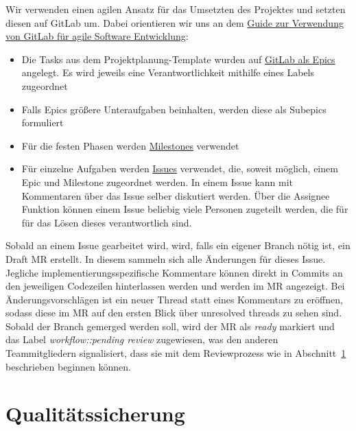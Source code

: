Wir verwenden einen agilen Ansatz für das Umsetzten des Projektes und setzten diesen auf GitLab um.
Dabei orientieren wir uns an dem
\href{https://about.gitlab.com/blog/2018/03/05/gitlab-for-agile-software-development/}{Guide
zur Verwendung von GitLab für agile Software Entwicklung}:
\begin{itemize}
    \item Die Tasks aus dem Projektplanung-Template wurden auf
    \href{https://git.haw-hamburg.de/groups/ss21-esep-gruppe-2.3/-/epics}{GitLab als Epics} angelegt.
    Es wird jeweils eine Verantwortlichkeit mithilfe eines Labels zugeordnet
    \item Falls Epics größere Unteraufgaben beinhalten, werden diese als Subepics formuliert
    \item Für die festen Phasen werden
    \href{https://git.haw-hamburg.de/groups/ss21-esep-gruppe-2.3/-/milestones}{Milestones} verwendet
    \item Für einzelne Aufgaben werden
    \href{https://git.haw-hamburg.de/groups/ss21-esep-gruppe-2.3/-/issues}{Issues}
    verwendet, die, soweit möglich, einem Epic und Milestone zugeordnet werden.
    In einem Issue kann mit Kommentaren über das Issue selber diskutiert werden.
    Über die Assignee Funktion können einem Issue beliebig viele Personen zugeteilt werden, die für
    für das Lösen dieses verantwortlich sind.
\end{itemize}
Sobald an einem Issue gearbeitet wird, wird, falls ein eigener Branch nötig ist, ein Draft MR
erstellt.
In diesem sammeln sich alle Änderungen für dieses Issue.
Jegliche implementierungsspezifische Kommentare können direkt in Commits an den jeweiligen
Codezeilen hinterlassen werden und werden im MR angezeigt.
Bei Änderungsvorschlägen ist ein neuer Thread statt eines Kommentars zu eröffnen, sodass diese im MR
auf den ersten Blick über \glqq unresolved threads\grqq{} zu sehen sind.
Sobald der Branch gemerged werden soll, wird der MR als \textit{ready} markiert und das Label
\textit{workflow::pending review} zugewiesen, was den anderen
Teammitgliedern signalisiert, dass sie mit dem Reviewprozess wie in
Abschnitt~\ref{sec:qualitaetssicherung} beschrieben beginnen können.


\section{Qualitätssicherung}\label{sec:qualitaetssicherung}

